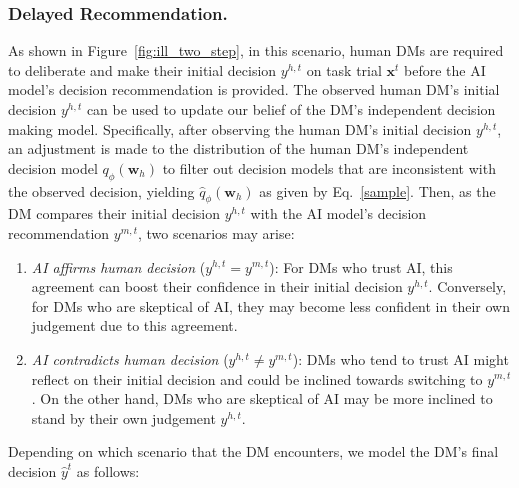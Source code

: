 \documentclass[letterpaper]{article} %
\begin{document}
\subsubsection{Delayed Recommendation.}
As shown in Figure~\ref{fig:ill_two_step}, in this scenario, human DMs are required to deliberate and make their initial decision $y^{h,t}$ on task trial $\bm{x}^t$ before the AI model's decision recommendation is provided. The observed human DM's initial decision $y^{h,t}$ can be used to update our belief of the DM's independent decision making model.
Specifically, after observing the human DM's initial decision $y^{h,t}$, an adjustment is made to the distribution of the human DM's independent decision model $q_{\phi}(\bm{w}_h)$ to filter out decision models that are inconsistent with the observed decision, yielding $\hat{q}_{\phi}(\bm{w}_h)$ as given by Eq.~\ref{sample}.
Then, as the DM compares their initial decision $y^{h,t}$ with the AI model's decision recommendation $y^{m,t}$,
two scenarios may arise:
\begin{enumerate}
    \item \emph{AI affirms human decision} ($y^{h,t} = y^{m,t}$): For DMs who trust AI, this agreement can boost their confidence in their initial decision $y^{h,t}$. Conversely, for DMs who are skeptical of AI, they may become less confident in their own judgement due to this agreement.

    \item \emph{AI contradicts human decision} ($y^{h,t} \neq y^{m,t} $):
    DMs who tend to trust AI might reflect on their initial decision and could be inclined towards switching to $y^{m,t}$. On the other hand, DMs who are skeptical of AI may be more inclined to stand by their own judgement $y^{h,t}$.


\end{enumerate}
Depending on which scenario that the DM encounters, we model the DM's final decision $\hat{y}^{t}$ as follows:
\end{document}
